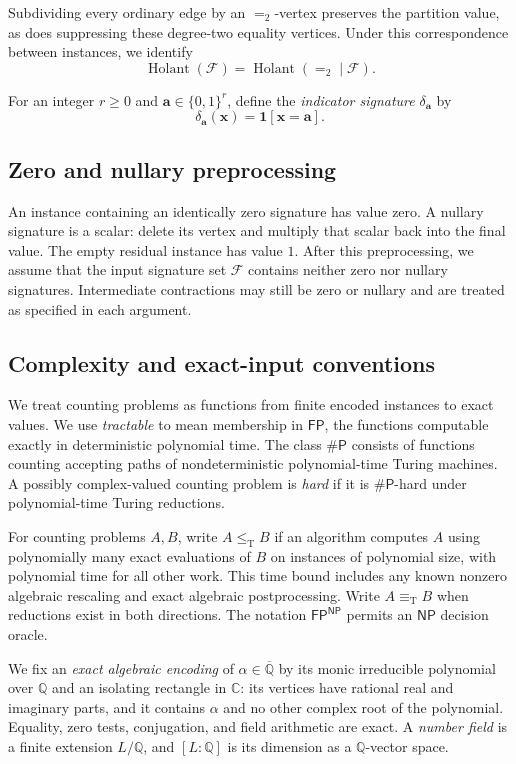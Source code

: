 \documentclass[11pt,letterpaper,onecolumn]{article}
\theoremstyle{plain}
\theoremstyle{definition}
\theoremstyle{remark}
\newcommand{\AlgNums}{\overline{\mathbb Q}}
\newcommand{\cF}{\mathcal F}
\newcommand{\Holant}{\operatorname{Holant}}
\newcommand{\FP}{\mathsf{FP}}
\newcommand{\SharpP}{\#\mathsf P}
\newcommand{\Eq}{=}
\newcommand{\one}{\mathbf 1}
\newcommand{\leT}{\leq_{\mathrm T}}
\newcommand{\equivT}{\equiv_{\mathrm T}}
\begin{document}
Subdividing every ordinary edge by an \(\Eq_2\)-vertex preserves the
partition value, as does suppressing these degree-two equality vertices.
Under this correspondence between instances, we identify
\[
\Holant(\cF)=\Holant(\Eq_2\mid\cF).
\]

For an integer \(r\ge0\) and \({\mathbf a}\in\{0,1\}^r\), define the
\emph{indicator signature} \(\delta_{\mathbf a}\) by
	\[
	\delta_{\mathbf a}({\mathbf x})=\one[{\mathbf x}={\mathbf a}].
	\]

\subsection{Zero and nullary preprocessing}
\label{subsec:zero-nullary}

An instance containing an identically zero signature has value zero.
A nullary signature is a scalar: delete its vertex and multiply that scalar
back into the final value.  The empty residual instance has value \(1\).
After this preprocessing, we assume that the input signature set \(\cF\)
contains neither zero nor nullary signatures.  Intermediate contractions
may still be zero or nullary and are treated as specified in each argument.

\subsection{Complexity and exact-input conventions}
\label{subsec:complexity-conventions}

We treat counting problems as functions from finite encoded instances to
exact values.  We use \emph{tractable} to mean membership in \(\FP\), the
functions computable exactly in deterministic polynomial time.
The class \(\SharpP\) consists of functions counting accepting paths of
nondeterministic polynomial-time Turing machines.  A possibly complex-valued counting
problem is \emph{hard} if it is \(\SharpP\)-hard under polynomial-time
Turing reductions.

For counting problems \(A,B\), write \(A\leT B\) if an algorithm computes
\(A\) using polynomially many exact evaluations of \(B\) on instances of
polynomial size, with polynomial time for all other work.  This time bound
includes any known nonzero algebraic rescaling and exact algebraic
postprocessing.  Write \(A\equivT B\) when reductions exist in both
directions.  The notation \(\FP^{\mathsf{NP}}\) permits an \(\mathsf{NP}\)
decision oracle.

We fix an \emph{exact algebraic encoding} of \(\alpha\in\AlgNums\) by its
monic irreducible polynomial over \(\mathbb Q\) and an isolating rectangle
in \(\mathbb C\): its vertices have rational real and imaginary parts,
and it contains \(\alpha\) and no other complex root of the polynomial.
Equality, zero tests, conjugation, and field arithmetic are exact.
A \emph{number field} is a finite extension \(L/\mathbb Q\), and
\([L:\mathbb Q]\) is its dimension as a \(\mathbb Q\)-vector space.
\end{document}
